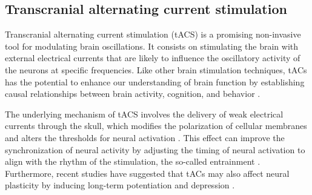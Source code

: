 \documentclass[../main.tex]{subfiles}
\begin{document}
\subsection{Transcranial alternating current stimulation}
Transcranial alternating current stimulation (tACS) is a promising non-invasive tool for modulating brain oscillations.
It consists on stimulating the brain with external electrical currents that are likely to influence the oscillatory activity of the neurons at specific frequencies.
Like other brain stimulation techniques, tACs has the potential to enhance our understanding of brain function by establishing causal relationships between brain activity, cognition, and behavior \citep{herrmann2013transcranial,dayan2013noninvasive,polania2018studying}.

The underlying mechanism of tACS involves the delivery of weak electrical currents through the skull, which modifies the polarization of cellular membranes and alters the thresholds for neural activation \citep{reato2013effects,liu2018immediate}.
This effect can improve the synchronization of neural activity by adjusting the timing of neural activation to align with the rhythm of the stimulation, the so-called entrainment \citep{helfrich2014entrainment, vogeti2022entrainment, liu2018immediate}.
Furthermore, recent studies have suggested that tACs may also affect neural plasticity by inducing long-term potentiation and depression \citep{schwab2021spike, jeong2021modulation}.
\end{document}
